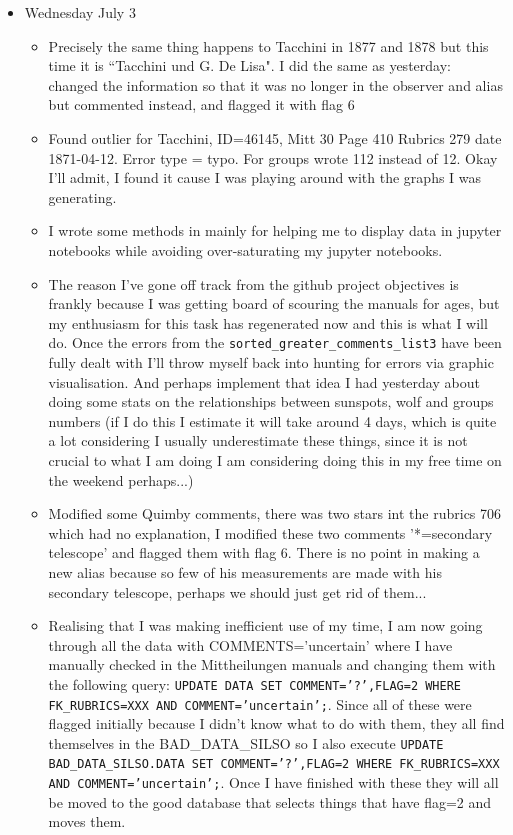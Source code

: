 \documentclass[12pt]{article}
\begin{document}
\begin{itemize}
\item Wednesday July 3
    \begin{itemize}
        \item Precisely the same thing happens to Tacchini in 1877 and 1878 but this time it is ``Tacchini und G. De Lisa". I did the same as yesterday: changed the information so that it was no longer in the observer and alias but commented instead, and flagged it with flag 6
        \item Found outlier for Tacchini, ID=46145, Mitt 30 Page 410 Rubrics 279 date 1871-04-12. Error type = typo. For groups wrote 112 instead of 12. Okay I'll admit, I found it cause I was playing around with the graphs I was generating. 
        \item I wrote some methods in  mainly for helping me to display data in jupyter notebooks while avoiding over-saturating my jupyter notebooks.
        \item The reason I've gone off track from the github project objectives is frankly because I was getting board of scouring the manuals for ages, but my enthusiasm for this task has regenerated now and this is what I will do. Once the errors from the \texttt{sorted\_greater\_comments\_list3} have been fully dealt with I'll throw myself back into hunting for errors via graphic visualisation. And perhaps implement that idea I had yesterday about doing some stats on the relationships between sunspots, wolf and groups numbers (if I do this I estimate it will take around 4 days, which is quite a lot considering I usually underestimate these things, since it is not crucial to what I am doing I am considering doing this in my free time on the weekend perhaps...)
        \item Modified some Quimby comments, there was two stars int the rubrics 706 which had no explanation, I modified these two comments '*=secondary telescope' and flagged them with flag 6. There is no point in making a new alias because so few of his measurements are made with his secondary telescope, perhaps we should just get rid of them...
        \item Realising that I was making inefficient use of my time, I am now going through all the data with COMMENTS='uncertain' where I have manually checked in the Mittheilungen manuals and changing them with the following query: \texttt{UPDATE DATA SET COMMENT='?',FLAG=2 WHERE FK\_RUBRICS=XXX AND COMMENT='uncertain';}. Since all of these were flagged initially because I didn't know what to do with them, they all find themselves in the BAD\_DATA\_SILSO so I also execute \texttt{UPDATE BAD\_DATA\_SILSO.DATA SET COMMENT='?',FLAG=2 WHERE FK\_RUBRICS=XXX AND COMMENT='uncertain';}. Once I have finished with these they will all be moved to the good database that selects things that have flag=2 and moves them.

\end{itemize}
\end{itemize}
\end{document}
